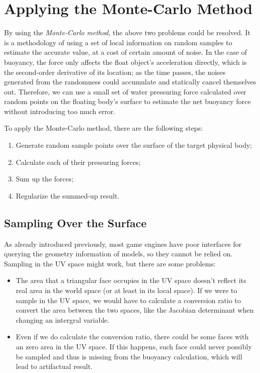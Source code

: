 \section{Applying the Monte-Carlo Method}

By using the \emph{Monte-Carlo method}, the above two problems could be resolved.
It is a methodology of using a set of local information on random samples to estimate the accurate value, at a cost of certain amount of noise.
In the case of buoyancy, the force only affects the float object's acceleration directly, which is the second-order derivative of its location;
as the time passes, the noises generated from the randomness could accumulate and statically cancel themselves out.
Therefore, we can use a small set of water pressuring force calculated over random points on the floating body's surface to estimate the net buoyancy force without introducing too much error.

To apply the Monte-Carlo method, there are the following steps:
\begin{enumerate}
	\item Generate random sample points over the surface of the target physical body;
	\item Calculate each of their pressuring forces;
	\item Sum up the forces;
	\item Regularize the summed-up result.
\end{enumerate}

\subsection{Sampling Over the Surface}

As already introduced previously, most game engines have poor interfaces for querying the geometry information of models, so they cannot be relied on. Sampling in the UV space might work, but there are some problems:
\begin{itemize}
	\item
		The area that a triangular face occupies in the UV space doesn't reflect its real area in the world space (or at least in its local space).
		If we were to sample in the UV space, we would have to calculate a conversion ratio to convert the area between the two spaces, like the Jacobian determinant when changing an intergral variable.
	\item Even if we do calculate the conversion ratio, there could be some faces with an zero area in the UV space.
		If this happens, such face could never possibly be sampled and thus is missing from the buoyancy calculation, which will lead to artifactual result.
\end{itemize}

